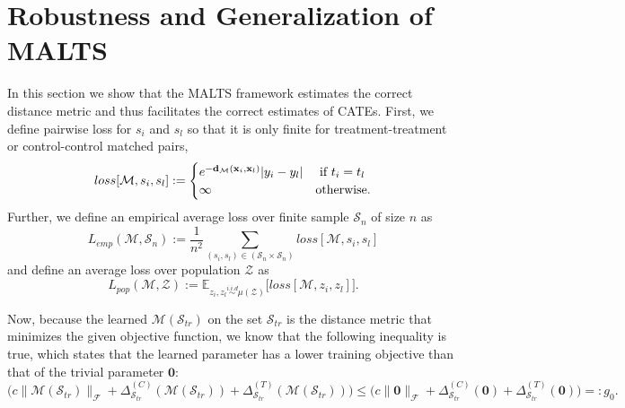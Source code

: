 

\section{Robustness and Generalization of MALTS}
\label{sec:theory}
In this section we show that the MALTS framework estimates the correct distance metric and thus facilitates the correct estimates of CATEs. 
First, we define pairwise loss for $s_i$ and $s_l$ so that it is only finite for treatment-treatment or control-control matched pairs,
\begin{equation}
   loss[\mathcal{M},s_i,s_l] := \begin{cases} 
      e^{-\mathbf{d}_\mathcal{M}(\mathbf{x}_i,\mathbf{x}_l)}|y_i-y_l| & \text{ if }t_i=t_l \\
      \infty & \text{otherwise}. \\
   \end{cases}
\end{equation}
Further, we define an empirical average loss over finite sample $\mathcal{S}_n$ of size $n$ as 
\begin{equation}
   L_{emp}(\mathcal{M},\mathcal{S}_n) := \frac{1}{n^2}\sum_{(s_i,s_l)\in(\mathcal{S}_n\times\mathcal{S}_n)} loss[\mathcal{M},s_i,s_l]
\end{equation}
and define an average loss over population $\mathcal{Z}$ as 
\begin{equation}
   L_{pop}(\mathcal{M},\mathcal{Z}) := \mathbb{E}_{z_i,z_l\overset{i.i.d}{\sim}\mu(\mathcal{Z})} \Big[ loss[\mathcal{M},z_i,z_l] \Big].
\end{equation}

Now, because the learned $\mathcal{M}(\mathcal{S}_{tr})$ on the set $\mathcal{S}_{tr}$ is the distance metric that minimizes the given objective function, we know that the following inequality is true, which states that the learned parameter has a lower training objective than that of the trivial parameter $\mathbf{0}$:
\begin{equation}
    \Big( c\|\mathcal{M}(\mathcal{S}_{tr})\|_\mathcal{F} + \Delta^{(C)}_{\mathcal{S}_{tr}}(\mathcal{M}(\mathcal{S}_{tr})) + \Delta^{(T)}_{\mathcal{S}_{tr}}(\mathcal{M}(\mathcal{S}_{tr})) \Big) \leq  \Big( c\|\mathbf{0}\|_\mathcal{F} + \Delta^{(C)}_{\mathcal{S}_{tr}}(\mathbf{0}) + \Delta^{(T)}_{\mathcal{S}_{tr}}(\mathbf{0}) \Big) =: g_0.
\end{equation}

